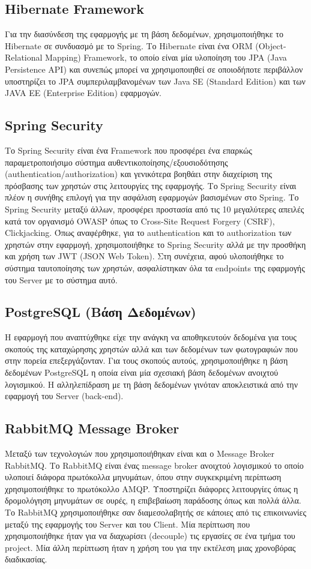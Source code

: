 \documentclass[oneside, 12pt]{book}
\begin{document}
\subsection{Hibernate Framework}
Για την διασύνδεση της εφαρμογής με τη βάση δεδομένων, χρησιμοποιήθηκε 
το Hibernate σε συνδυασμό με το Spring. Το Hibernate είναι ένα ORM 
(Object-Relational Mapping) Framework, το οποίο είναι μία υλοποίηση 
του  JPA (Java Persistence API) και συνεπώς μπορεί να χρησιμοποιηθεί 
σε οποιοδήποτε περιβάλλον υποστηρίζει το JPA συμπεριλαμβανομένων των 
Java SE (Standard Edition) και των JAVA EE (Enterprise Edition) 
εφαρμογών.
\cite{hibernate_orm}

\subsection{Spring Security}
Το Spring Security είναι ένα Framework που προσφέρει ένα επαρκώς 
παραμετροποιήσιμο σύστημα αυθεντικοποίησης/εξουσιοδότησης 
(authentication/authorization) και γενικότερα βοηθάει στην διαχείριση 
της πρόσβασης των χρηστών στις λειτουργίες της εφαρμογής. Το Spring 
Security είναι πλέον η συνήθης επιλογή για την ασφάλιση εφαρμογών 
βασισμένων στο Spring. Το Spring Security μεταξύ άλλων, προσφέρει 
προστασία από τις 10 μεγαλύτερες απειλές κατά τον οργανισμό OWASP όπως 
το Cross-Site Request Forgery (CSRF), Clickjacking.
\cite{spring_security}
Όπως αναφέρθηκε, για το authentication και το authorization των χρηστών στην εφαρμογή, χρησιμοποιήθηκε το Spring Security αλλά με την προσθήκη και χρήση των JWT (JSON Web Token). Στη συνέχεια, αφού υλοποιήθηκε το σύστημα ταυτοποίησης των χρηστών, ασφαλίστηκαν όλα τα endpoints της εφαρμογής του Server με το σύστημα αυτό.

\subsection{PostgreSQL (Βάση Δεδομένων)} Η εφαρμογή που αναπτύχθηκε είχε 
την ανάγκη να αποθηκευτούν δεδομένα για τους σκοπούς της καταχώρησης 
χρηστών αλλά και των δεδομένων των φωτογραφιών που στην πορεία 
επεξεργάζονταν. Για τους σκοπούς αυτούς, χρησιμοποιήθηκε η βάση 
δεδομένων PostgreSQL η οποία είναι μία σχεσιακή βάση δεδομένων 
ανοιχτού λογισμικού. Η αλληλεπίδραση με τη βάση δεδομένων γινόταν 
αποκλειστικά από την εφαρμογή του Server (back-end).

\subsection{RabbitMQ Message Broker} Μεταξύ των τεχνολογιών που 
χρησιμοποιήθηκαν είναι και ο Message Broker RabbitMQ. Το RabbitMQ είναι ένας 
message broker ανοιχτού λογισμικού το οποίο υλοποιεί διάφορα πρωτόκολλα μηνυμάτων, 
όπου στην συγκεκριμένη περίπτωση χρησιμοποιήθηκε το πρωτόκολλο AMQP. Υποστηρίζει 
διάφορες λειτουργίες όπως η δρομολόγηση μηνυμάτων σε ουρές, η επιβεβαίωση παράδοσης 
όπως και πολλά άλλα. Το RabbitMQ χρησιμοποιήθηκε σαν διαμεσολαβητής σε κάποιες από 
τις επικοινωνίες μεταξύ της εφαρμογής του Server και του Client. Μία περίπτωση που 
χρησιμοποιήθηκε ήταν για να διαχωρίσει (decouple) τις εργασίες σε ένα τμήμα του 
project. Μία άλλη περίπτωση ήταν η χρήση του για την εκτέλεση μιας χρονοβόρας 
διαδικασίας.
\cite{rabbitmq_features}
\end{document}
